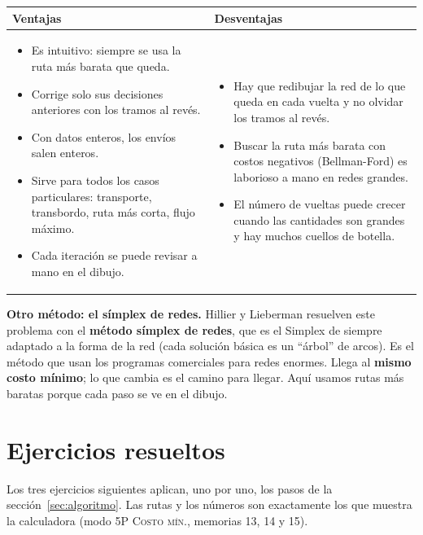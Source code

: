 \documentclass[11pt,a4paper]{article}
\begin{document}
\begin{center}\small
\begin{tabular}{p{7.2cm}p{7.2cm}}
\toprule
\textbf{Ventajas} & \textbf{Desventajas} \\
\midrule
\begin{itemize}[leftmargin=*, itemsep=2pt, topsep=2pt]
  \item Es intuitivo: siempre se usa la ruta más barata que queda.
  \item Corrige solo sus decisiones anteriores con los tramos al revés.
  \item Con datos enteros, los envíos salen enteros.
  \item Sirve para todos los casos particulares: transporte, transbordo, ruta más corta, flujo máximo.
  \item Cada iteración se puede revisar a mano en el dibujo.
\end{itemize}
&
\begin{itemize}[leftmargin=*, itemsep=2pt, topsep=2pt]
  \item Hay que redibujar la red de lo que queda en cada vuelta y no olvidar los tramos al revés.
  \item Buscar la ruta más barata con costos negativos (Bellman-Ford) es laborioso a mano en redes grandes.
  \item El número de vueltas puede crecer cuando las cantidades son grandes y hay muchos cuellos de botella.
\end{itemize}
\\
\bottomrule
\end{tabular}
\end{center}

\textbf{Otro método: el símplex de redes.} Hillier y Lieberman resuelven este problema con el \textbf{método símplex de
redes}, que es el Simplex de siempre adaptado a la forma de la red (cada solución básica es un ``árbol'' de arcos). Es
el método que usan los programas comerciales para redes enormes. Llega al \textbf{mismo costo mínimo}; lo que cambia
es el camino para llegar. Aquí usamos rutas más baratas porque cada paso se ve en el dibujo.

\part{Ejercicios resueltos}
\setcounter{section}{0}

Los tres ejercicios siguientes aplican, uno por uno, los pasos de la sección~\ref{sec:algoritmo}. Las rutas y los
números son exactamente los que muestra la calculadora (modo \textsc{5P Costo mín.}, memorias 13, 14 y 15).
\end{document}
